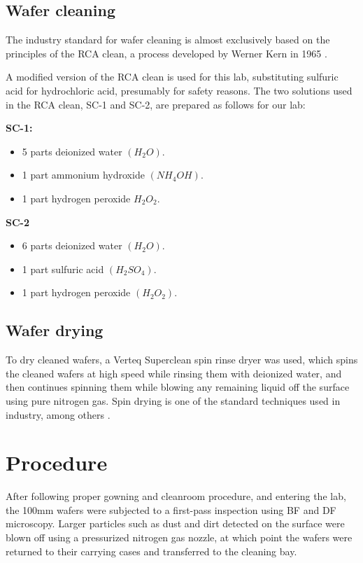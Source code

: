 \documentclass[12pt]{report}
\begin{document}
\subsection{Wafer cleaning}

The industry standard for wafer cleaning is almost exclusively based on the principles of the RCA clean, a process developed by Werner Kern in 1965 \cite{kern}.

A modified version of the RCA clean is used for this lab, substituting sulfuric acid for hydrochloric acid, presumably for safety reasons. The two solutions used in the RCA clean, SC-1 and SC-2, are prepared as follows for our lab: 

\textbf{SC-1:}
\begin{itemize}
	\item 5 parts deionized water \((H_2O)\).
	\item 1 part ammonium hydroxide \((NH_4OH)\).
	\item 1 part hydrogen peroxide \(H_2O_2\).
\end{itemize}

\textbf{SC-2}
\begin{itemize}
	\item 6 parts deionized water \((H_2O)\).
	\item 1 part sulfuric acid \((H_2SO_4)\).
	\item 1 part hydrogen peroxide \((H_2O_2)\).
\end{itemize}

\subsection{Wafer drying}

To dry cleaned wafers, a Verteq Superclean spin rinse dryer was used, which spins the cleaned wafers at high speed while rinsing them with deionized water, and then continues spinning them while blowing any remaining liquid off the surface using pure nitrogen gas. Spin drying is one of the standard techniques used in industry, among others \cite{drying}.

\section{Procedure}

After following proper gowning and cleanroom procedure, and entering the lab, the 100mm wafers were subjected to a first-pass inspection using BF and DF microscopy. Larger particles such as dust and dirt detected on the surface were blown off using a pressurized nitrogen gas nozzle, at which point the wafers were returned to their carrying cases and transferred to the cleaning bay.
\end{document}
